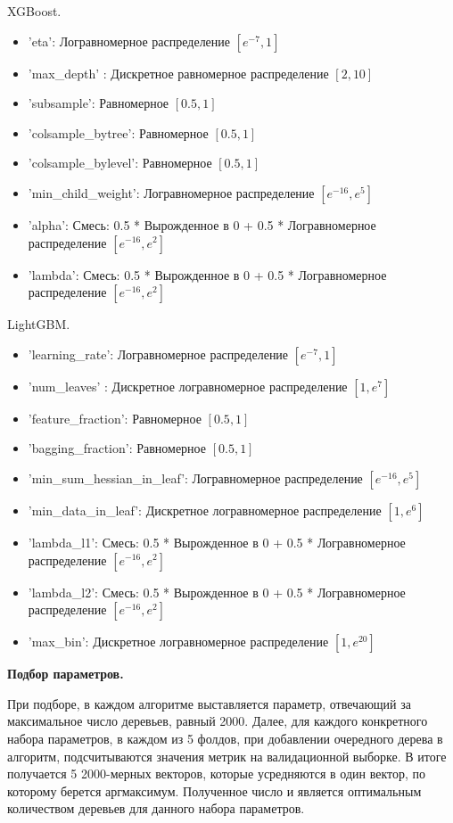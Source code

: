\documentclass{article}
\begin{document}
\medskip
\noindent XGBoost.
\begin{itemize}
  \item 'eta': Логравномерное распределение $[e^{-7}, 1]$
  \item 'max\_depth' : Дискретное равномерное распределение $[2, 10]$
  \item 'subsample': Равномерное $[0.5, 1]$
  \item 'colsample\_bytree': Равномерное $[0.5, 1]$
  \item 'colsample\_bylevel': Равномерное $[0.5, 1]$
  \item 'min\_child\_weight': Логравномерное распределение $[e^{-16}, e^{5}]$
  \item 'alpha': Смесь: 0.5 * Вырожденное в 0 + 0.5 * Логравномерное распределение $[e^{-16}, e^{2}]$
  \item 'lambda': Смесь: 0.5 * Вырожденное в 0 + 0.5 * Логравномерное распределение $[e^{-16}, e^{2}]$
\end{itemize}

\medskip
\noindent LightGBM.
\begin{itemize}
  \item 'learning\_rate': Логравномерное распределение $[e^{-7}, 1]$
  \item 'num\_leaves' : Дискретное логравномерное распределение $[1, e^{7}]$
  \item 'feature\_fraction': Равномерное $[0.5, 1]$
  \item 'bagging\_fraction': Равномерное $[0.5, 1]$
  \item 'min\_sum\_hessian\_in\_leaf': Логравномерное распределение $[e^{-16}, e^{5}]$
  \item 'min\_data\_in\_leaf':  Дискретное логравномерное распределение $[1, e^{6}]$
  \item 'lambda\_l1': Смесь: 0.5 * Вырожденное в 0 + 0.5 * Логравномерное распределение $[e^{-16}, e^{2}]$
  \item 'lambda\_l2': Смесь: 0.5 * Вырожденное в 0 + 0.5 * Логравномерное распределение $[e^{-16}, e^{2}]$
  \item 'max\_bin': Дискретное логравномерное распределение $[1, e^{20}]$
\end{itemize}

\medskip
\noindent\textbf{Подбор параметров.}
\medskip

При подборе, в каждом алгоритме выставляется параметр, отвечающий за максимальное число деревьев, равный 2000. Далее, для каждого конкретного набора параметров, в каждом из 5 фолдов, при добавлении очередного дерева в алгоритм, подсчитываются значения метрик на валидационной выборке. В итоге получается 5 2000-мерных векторов, которые усредняются в один вектор, по которому берется аргмаксимум. Полученное число и является оптимальным количеством деревьев для данного набора параметров.
\end{document}

